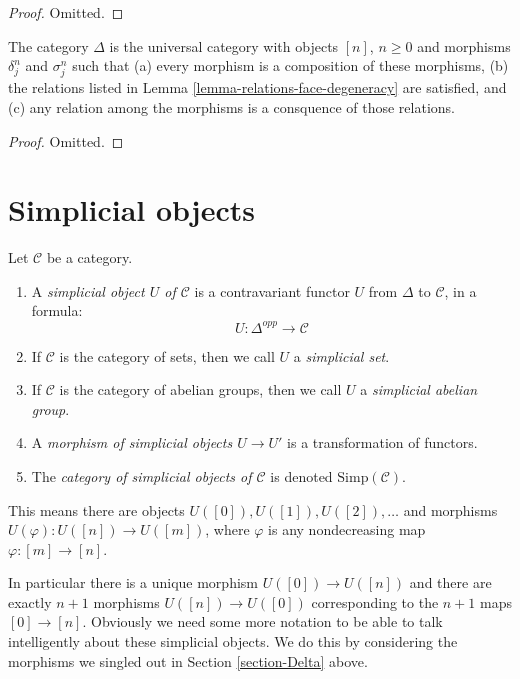 \begin{proof}
Omitted.
\end{proof}

\begin{lemma}
\label{lemma-face-degeneracy-category}
The category $\Delta$ is the universal category
with objects $[n]$, $n \geq 0$ and morphisms
$\delta^n_j$ and $\sigma^n_j$ such that (a) every morphism is
a composition of these morphisms, (b) the relations
listed in Lemma \ref{lemma-relations-face-degeneracy} are satisfied,
and (c) any relation among the morphisms is a consquence of
those relations.
\end{lemma}

\begin{proof}
Omitted.
\end{proof}







\section{Simplicial objects}
\label{section-simplicial-object}

\begin{definition}
\label{definition-simplicial-object}
Let $\mathcal{C}$ be a category.
\begin{enumerate}
\item A {\it simplicial object $U$ of $\mathcal{C}$}
is a contravariant functor $U$ from $\Delta$ to
$\mathcal{C}$, in a formula:
$$
U : \Delta^{opp} \longrightarrow \mathcal{C}
$$
\item If $\mathcal{C}$ is the category of sets, then we call
$U$ a {\it simplicial set}.
\item If $\mathcal{C}$ is the category of abelian groups,
then we call $U$ a {\it simplicial abelian group}.
\item A {\it morphism of simplicial objects $U \to U'$}
is a transformation of functors.
\item The {\it category of simplicial objects of $\mathcal{C}$}
is denoted $\text{Simp}(\mathcal{C})$.
\end{enumerate}
\end{definition}

\noindent
This means there are objects $U([0]), U([1]), U([2]), \ldots$
and morphisms $U(\varphi) : U([n]) \to U([m])$,
where $\varphi$ is any nondecreasing map $\varphi : [m] \to [n]$. 

\medskip\noindent
In particular there is a unique morphism $U([0]) \to U([n])$ and there are
exactly $n + 1$ morphisms $U([n]) \to U([0])$ corresponding to
the $n + 1$ maps $[0] \to [n]$. Obviously we need some more notation
to be able to talk 
intelligently about these simplicial objects. We do this by considering
the morphisms we singled out in Section \ref{section-Delta} above.

